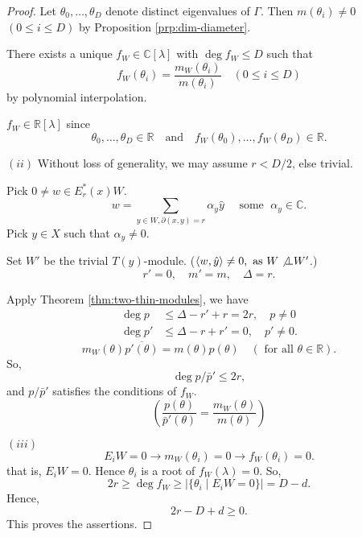 \documentclass[
]{book}
\theoremstyle{definition}
\theoremstyle{definition}
\theoremstyle{definition}
\theoremstyle{definition}
\theoremstyle{remark}
\begin{document}
\begin{proof}
Let \(\theta_0, \ldots, \theta_D\) denote distinct eigenvalues of \(\Gamma\). Then \(m(\theta_i) \neq 0\) \((0\leq i\leq D)\) by Proposition \ref{prp:dim-diameter}.

There exists a unique \(f_W\in \mathbb{C}[\lambda]\) with \(\deg f_W\leq D\) such that
\[f_W(\theta_i) = \frac{m_W(\theta_i)}{m(\theta_i)} \quad (0\leq i\leq D)\]
by polynomial interpolation.

\(f_W\in \mathbb{R}[\lambda]\) since
\[\theta_0, \ldots, \theta_D\in \mathbb{R} \quad \text{and}\quad f_W(\theta_0), \ldots, f_W(\theta_D) \in \mathbb{R}.\]

\((ii)\) Without loss of generality, we may assume \(r < D/2\), else trivial.

Pick \(0\neq w \in E^*_r(x)W\).
\[w = \sum_{y\in W, \partial(x,y) = r}\alpha_y\hat{y} \quad \text{ some } \; \alpha_y\in \mathbb{C}.\]
Pick \(y\in X\) such that \(\alpha_y\neq 0\).

Set \(W'\) be the trivial \(T(y)\)-module. (\(\langle w, \hat{y}\rangle \neq 0, \text{ as } W\not\bot W'\).)
\[r' = 0, \quad m' = m, \quad \Delta = r.\]

Apply Theorem \ref{thm:two-thin-modules}, we have
\begin{align}
\deg p & \leq \Delta - r' + r = 2r, \quad p\neq 0\\
\deg p' & \leq \Delta - r + r' = 0 , \quad p'\neq 0.
\end{align}
\[m_W(\theta)\overline{p'(\theta)} = m(\theta)p(\theta) \quad (\text{ for all } \theta \in \mathbb{R}).\]
So,
\[\deg p/\bar{p}' \leq 2r,\]
and \(p/\bar{p}'\) satisfies the conditions of \(f_W\).
\[\left(\frac{p(\theta)}{\bar{p}'(\theta)} = \frac{m_W(\theta)}{m(\theta)}\right)\]

\((iii)\)
\[E_iW = 0 \rightarrow m_W(\theta_i) = 0 \rightarrow f_W(\theta_i) = 0.\]
that is, \(E_iW = 0\). Hence \(\theta_i\) is a root of \(f_W(\lambda) = 0\).
So,
\[2r \geq \deg f_W \geq |\{\theta_i\mid E_iW = 0\}| = D-d.\]
Hence,
\[2r-D + d \geq 0.\]
This proves the assertions.
\end{proof}
\end{document}

